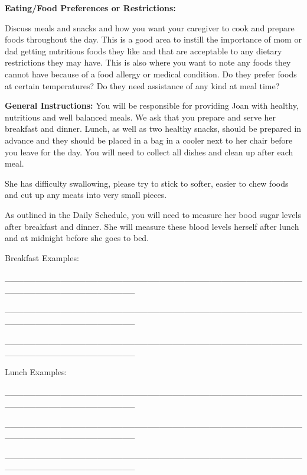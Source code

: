 \documentclass[]{article}
\begin{document}
\textbf{Eating/Food Preferences or Restrictions:}

Discuss meals and snacks and how you want your caregiver to cook and
prepare foods throughout the day. This is a good area to instill the
importance of mom or dad getting nutritious foods they like and that are
acceptable to any dietary restrictions they may have. This is also where
you want to note any foods they cannot have because of a food allergy or
medical condition. Do they prefer foods at certain temperatures? Do they
need assistance of any kind at meal time?

\textbf{General Instructions:} You will be responsible for providing
Joan with healthy, nutritious and well balanced meals. We ask that you
prepare and serve her breakfast and dinner. Lunch, as well as two
healthy snacks, should be prepared in advance and they should be placed
in a bag in a cooler next to her chair before you leave for the day. You
will need to collect all dishes and clean up after each meal.

She has difficulty swallowing, please try to stick to softer, easier to
chew foods and cut up any meats into very small pieces.

As outlined in the Daily Schedule, you will need to measure her bood
sugar levels after breakfast and dinner. She will measure these blood
levels herself after lunch and at midnight before she goes to bed.

Breakfast Examples:

\_\_\_\_\_\_\_\_\_\_\_\_\_\_\_\_\_\_\_\_\_\_\_\_\_\_\_\_\_\_\_\_\_\_\_\_\_\_\_\_\_\_\_\_\_\_\_\_\_\_\_\_\_\_\_\_\_\_\_\_\_\_\_\_\_\_\_\_\_

\_\_\_\_\_\_\_\_\_\_\_\_\_\_\_\_\_\_\_\_\_\_\_\_\_\_\_\_\_\_\_\_\_\_\_\_\_\_\_\_\_\_\_\_\_\_\_\_\_\_\_\_\_\_\_\_\_\_\_\_\_\_\_\_\_\_\_\_\_

\_\_\_\_\_\_\_\_\_\_\_\_\_\_\_\_\_\_\_\_\_\_\_\_\_\_\_\_\_\_\_\_\_\_\_\_\_\_\_\_\_\_\_\_\_\_\_\_\_\_\_\_\_\_\_\_\_\_\_\_\_\_\_\_\_\_\_\_\_

Lunch Examples:

\_\_\_\_\_\_\_\_\_\_\_\_\_\_\_\_\_\_\_\_\_\_\_\_\_\_\_\_\_\_\_\_\_\_\_\_\_\_\_\_\_\_\_\_\_\_\_\_\_\_\_\_\_\_\_\_\_\_\_\_\_\_\_\_\_\_\_\_\_

\_\_\_\_\_\_\_\_\_\_\_\_\_\_\_\_\_\_\_\_\_\_\_\_\_\_\_\_\_\_\_\_\_\_\_\_\_\_\_\_\_\_\_\_\_\_\_\_\_\_\_\_\_\_\_\_\_\_\_\_\_\_\_\_\_\_\_\_\_

\_\_\_\_\_\_\_\_\_\_\_\_\_\_\_\_\_\_\_\_\_\_\_\_\_\_\_\_\_\_\_\_\_\_\_\_\_\_\_\_\_\_\_\_\_\_\_\_\_\_\_\_\_\_\_\_\_\_\_\_\_\_\_\_\_\_\_\_\_
\end{document}
